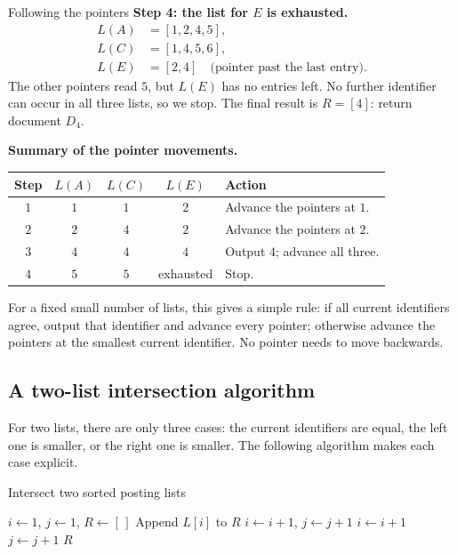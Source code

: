 \documentclass[a4paper,12pt,oneside]{report}
\begin{document}
\begin{framedexample}{Following the pointers}
\textbf{Step 4: the list for $E$ is exhausted.}
\[
\begin{aligned}
  L(A)&=[1,2,4,\boxed{5}],\\
  L(C)&=[1,4,\boxed{5},6],\\
  L(E)&=[2,4]\quad\text{(pointer past the last entry)}.
\end{aligned}
\]
The other pointers read $5$, but $L(E)$ has no entries left. No
further identifier can occur in all three lists, so we stop. The
final result is $R=[4]$: return document $D_4$.

\textbf{Summary of the pointer movements.}
\begin{center}
\begin{tabular}{c|ccc|l}
  Step & $L(A)$ & $L(C)$ & $L(E)$ & Action\\\hline
  $1$ & $1$ & $1$ & $2$ & Advance the pointers at $1$.\\
  $2$ & $2$ & $4$ & $2$ & Advance the pointers at $2$.\\
  $3$ & $4$ & $4$ & $4$ & Output $4$; advance all three.\\
  $4$ & $5$ & $5$ & exhausted & Stop.
\end{tabular}
\end{center}
\end{framedexample}

For a fixed small number of lists, this gives a simple rule: if all
current identifiers agree, output that identifier and advance every
pointer; otherwise advance the pointers at the smallest current
identifier. No pointer needs to move backwards.

\subsection{A two-list intersection algorithm}

For two lists, there are only three cases: the current identifiers
are equal, the left one is smaller, or the right one is smaller.
The following algorithm makes each case explicit.

\begin{framedalgo}{Intersect two sorted posting lists}\label{alg:posting-intersection}
\begin{algorithmic}[1]
    \State $i\gets1$, $j\gets1$, $R\gets[\,]$
        \State Append $L[i]$ to $R$
        \State $i\gets i+1$, $j\gets j+1$
        \State $i\gets i+1$
      \Else
        \State $j\gets j+1$
      \EndIf
    \EndWhile
    \State \Return $R$
  \EndFunction
\end{algorithmic}
\end{framedalgo}
\end{document}
